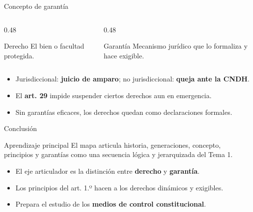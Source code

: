 \documentclass[
  spanish,
  aspectratio=169,
  xcolor={dvipsnames,table}
]{beamer}
\begin{document}
\begin{frame}{Concepto de garantía}
  \begin{columns}[T]
    \begin{column}{0.48\linewidth}
      \begin{block}{Derecho}
        El bien o facultad protegida.
      \end{block}
    \end{column}
    \begin{column}{0.48\linewidth}
      \begin{block}{Garantía}
        Mecanismo jurídico que lo formaliza y hace exigible.
      \end{block}
    \end{column}
  \end{columns}
  \vspace{0.2cm}
  \begin{itemize}
    \item Jurisdiccional: \textbf{juicio de amparo}; no jurisdiccional: \textbf{queja ante la CNDH}.
    \item El \textbf{art. 29} impide suspender ciertos derechos aun en emergencia.
    \item Sin garantías eficaces, los derechos quedan como declaraciones formales.
  \end{itemize}
\end{frame}

\begin{frame}{Conclusión}
  \begin{block}{Aprendizaje principal}
    El mapa articula historia, generaciones, concepto, principios y garantías como una secuencia lógica y jerarquizada del Tema 1.
  \end{block}
  \begin{itemize}
    \item El eje articulador es la distinción entre \textbf{derecho} y \textbf{garantía}.
    \item Los principios del art. 1.º hacen a los derechos dinámicos y exigibles.
    \item Prepara el estudio de los \textbf{medios de control constitucional}.
  \end{itemize}
\end{frame}
\end{document}
